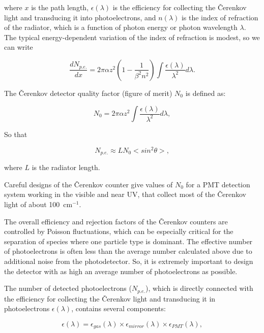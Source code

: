 \noindent
where $x$ is the path length, $\epsilon(\lambda)$ is the efficiency for 
collecting the {\v C}erenkov light and transducing it into photoelectrons,
and $n(\lambda)$ is the index of refraction of the radiator, which is a 
function of photon energy or photon wavelength $\lambda$.  The typical 
energy-dependent variation of the index of refraction is modest, so we can 
write

\begin{equation}
\frac{dN_{p.e.}}{dx} = 2\pi\alpha z^2\displaystyle\left(1-\frac{1}{\beta^2n^2}\right)\int{\frac {\epsilon(\lambda)}{\lambda^2}d\lambda}.
\end{equation}

\noindent
The {\v C}erenkov detector quality factor (figure of merit) $N_0$ is defined 
as:

\begin{equation}
N_0 = 2\pi\alpha z^2\int{\frac {\epsilon(\lambda)}{\lambda^2}d\lambda},
\end{equation}

\noindent
So that

\begin{equation}
N_{p.e.}\approx L N_0 <sin^2\theta>,
\end{equation}

\noindent
where $L$ is the radiator length.

Careful designs of the {\v C}erenkov counter give values of $N_0$ for a 
PMT detection system working in the visible and near UV, that collect 
most of the {\v C}erenkov light of about 100~cm$^{-1}$.

The overall efficiency and rejection factors of the {\v C}erenkov counters 
are controlled by Poisson fluctuations, which can be especially critical for 
the separation of species where one particle type is dominant.  The 
effective number of photoelectrons is often less than the average number 
calculated above due to additional noise from the photodetector.  So, it is 
extremely important to design the detector with as high an average number of 
photoelectrons as possible.

The number of detected photoelectrons ($N_{p.e.}$), which is directly 
connected with the efficiency for collecting the {\v C}erenkov light and 
transducing it in photoelectrons $\epsilon(\lambda)$, contains several 
components:

\begin{equation}
\epsilon(\lambda) = \epsilon_{gas}(\lambda)\times\epsilon_{mirror}(\lambda)\times\epsilon_{PMT}(\lambda),
\end{equation}

